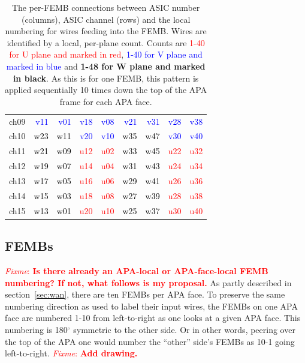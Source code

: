 \documentclass[pdftex,12pt,letter]{article}
\newcommand{\fixme}[1]{\textcolor{red}{\textit{Fixme}: \textbf{#1}}}
\begin{document}
\begin{table}[htp]
\begin{tabular}{r|rrrrrrrr}
ch09 & \textcolor{blue}{v11} & \textcolor{blue}{v01} & \textcolor{blue}{v18} & \textcolor{blue}{v08} & \textcolor{blue}{v21} & \textcolor{blue}{v31} & \textcolor{blue}{v28} & \textcolor{blue}{v38}\\
ch10 & \textcolor{black}{w23} & \textcolor{black}{w11} & \textcolor{blue}{v20} & \textcolor{blue}{v10} & \textcolor{black}{w35} & \textcolor{black}{w47} & \textcolor{blue}{v30} & \textcolor{blue}{v40}\\
ch11 & \textcolor{black}{w21} & \textcolor{black}{w09} & \textcolor{red}{u12} & \textcolor{red}{u02} & \textcolor{black}{w33} & \textcolor{black}{w45} & \textcolor{red}{u22} & \textcolor{red}{u32}\\
ch12 & \textcolor{black}{w19} & \textcolor{black}{w07} & \textcolor{red}{u14} & \textcolor{red}{u04} & \textcolor{black}{w31} & \textcolor{black}{w43} & \textcolor{red}{u24} & \textcolor{red}{u34}\\
ch13 & \textcolor{black}{w17} & \textcolor{black}{w05} & \textcolor{red}{u16} & \textcolor{red}{u06} & \textcolor{black}{w29} & \textcolor{black}{w41} & \textcolor{red}{u26} & \textcolor{red}{u36}\\
ch14 & \textcolor{black}{w15} & \textcolor{black}{w03} & \textcolor{red}{u18} & \textcolor{red}{u08} & \textcolor{black}{w27} & \textcolor{black}{w39} & \textcolor{red}{u28} & \textcolor{red}{u38}\\
ch15 & \textcolor{black}{w13} & \textcolor{black}{w01} & \textcolor{red}{u20} & \textcolor{red}{u10} & \textcolor{black}{w25} & \textcolor{black}{w37} & \textcolor{red}{u30} & \textcolor{red}{u40}\\
\hline
\end{tabular}


  \caption{The per-FEMB connections between ASIC number (columns), ASIC channel (rows) and the local numbering for wires feeding into the FEMB.  Wires are identified by a local, per-plane count.  Counts are \textcolor{red}{1-40 for U plane and marked in red}, \textcolor{blue}{1-40 for V plane and marked in blue} and \textbf{1-48 for W plane and marked in black}.  As this is for one FEMB, this pattern is applied sequentially 10 times down the top of the APA frame for each APA face.}
\end{table}

\subsection{FEMBs}
\label{sec:fembs}

\fixme{Is there already an APA-local or APA-face-local FEMB numbering?
  If not, what follows is my proposal.}  As partly described in
section~\ref{sec:wan}, there are ten FEMBs per APA face.  To preserve
the same numbering direction as used to label their input wires, the
FEMBs on one APA face are numbered 1-10 from left-to-right as one
looks at a given APA face.  This numbering is 180$^\circ$ symmetric to
the other side.  Or in other words, peering over the top of the APA
one would number the ``other'' side's FEMBs as 10-1 going
left-to-right.  \fixme{Add drawing.}
\end{document}
